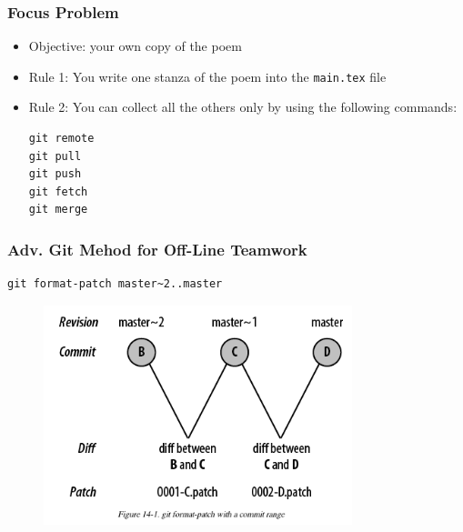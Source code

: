 \documentclass[hyperref={colorlinks=false},handout,10pt]{beamer}
\let\olditem\item
\renewcommand{\item}{\setlength{\itemsep}{0.5\baselineskip}\olditem}
\begin{document}
\begin{frame}[fragile]
    \frametitle{Focus Problem}
    \begin{itemize}
        \item Objective: your own copy of the poem
        \item Rule 1: You write one stanza of the poem into the
            \texttt{main.tex} file
        \item Rule 2: You can collect all the others only by using the following
            commands:
            \begin{lstlisting}
git remote 
git pull 
git push
git fetch 
git merge
            \end{lstlisting}
    \end{itemize}
\end{frame}

\begin{frame}
    \frametitle{Adv. Git Mehod for Off-Line Teamwork}
    \begin{lstlisting}
git format-patch master~2..master
    \end{lstlisting}
    \begin{figure}
        \begin{center}
            \includegraphics[width=0.8\textwidth]{images/gitformatpatch.png}
        \end{center}
    \end{figure}
\end{frame}
\end{document}
